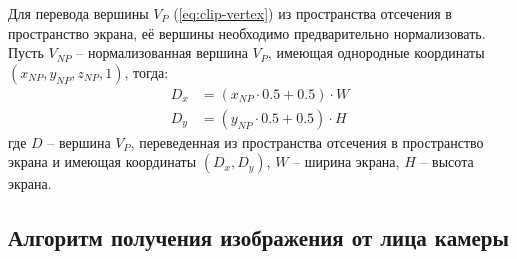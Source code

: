 Для перевода вершины $V_P$ (\ref{eq:clip-vertex}) из пространства отсечения в пространство экрана, её вершины необходимо предварительно нормализовать. Пусть $V_{NP}$ -- нормализованная вершина $V_P$, имеющая однородные координаты $(x_{NP}, y_{NP}, z_{NP}, 1)$, тогда:
\begin{equation}
	\begin{aligned}
		D_x &= (x_{NP} \cdot 0.5 + 0.5) \cdot W \\
		D_y &= (y_{NP} \cdot 0.5 + 0.5) \cdot H
	\end{aligned}
\end{equation}
где $D$ -- вершина $V_P$, переведенная из пространства отсечения в пространство экрана и имеющая координаты $(D_x, D_y)$, $W$ -- ширина экрана, $H$ -- высота экрана.

\subsection{Алгоритм получения изображения от лица камеры}

